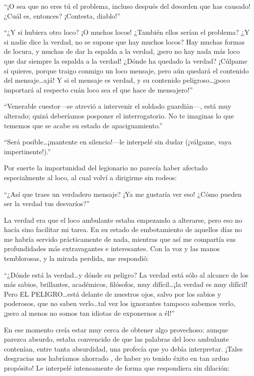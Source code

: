 \documentclass[11pt,openany]{book}
\begin{document}
“¡O sea que no eres tú el problema, incluso después del desorden que has causado! ¿Cuál es, entonces? ¡Contesta, diablo!” 

“¿Y si hubiera otro loco? ¡O muchos locos! ¿También ellos serían el problema? ¿Y si nadie dice la verdad, no se supone que hay muchos locos? Hay muchas formas de locura, y muchas de dar la espalda a la verdad, ¡pero no hay nada más loco que dar siempre la espalda a la verdad! ¿Dónde ha quedado la verdad? ¡Cúlpame si quieres, porque traigo conmigo un loco mensaje, pero aún quedará el contenido del mensaje\dots ajá! Y si el mensaje es verdad, y su contenido peligroso\dots ¡poco importará al respecto cuán loco sea el que hace de mensajero!” 

“Venerable cuestor—se atrevió a intervenir el soldado guardián—, está muy alterado; quizá deberíamos posponer el interrogatorio. No te imaginas lo que tememos que se acabe su estado de apaciguamiento.” 

“Será posible\dots ¡mantente en silencio!—le interpelé sin dudar (¡válgame, vaya impertinente!).” 

Por suerte la importunidad del legionario no parecía haber afectado especialmente al loco, al cual volví a dirigirme sin rodeos: 

“¿Así que traes un verdadero mensaje? ¡Ya me gustaría ver eso! ¿Cómo pueden ser la verdad tus desvaríos?” 

La verdad era que el loco ambulante estaba empezando a alterarse, pero eso no hacía sino facilitar mi tarea. En su estado de embotamiento de aquellos días no me habría servido prácticamente de nada, mientras que así me compartía sus profundidades más extravagantes e interesantes. Con la voz y las manos temblorosas, y la mirada perdida, me respondió: 

“¿Dónde está la verdad\dots y dónde su peligro? La verdad está sólo al alcance de los más sabios, brillantes, académicos, filósofos, muy difícil\dots ¡la verdad es muy difícil! Pero EL PELIGRO\dots está delante de nuestros ojos, salvo por los sabios y poderosos, que no saben verlo\dots tal vez los ignorantes tampoco sabemos verlo, ¡pero al menos no somos tan idiotas de exponernos a él!” 

En ese momento creía estar muy cerca de obtener algo provechoso: aunque parezca absurdo, estaba convencido de que las palabras del loco ambulante contenían, entre tanta absurdidad, una profecía que yo debía interpretar. ¡Tales desgracias nos habríamos ahorrado , de haber yo tenido éxito en tan arduo propósito! Le interpelé intensamente de forma que respondiera sin dilación: 
\end{document}
